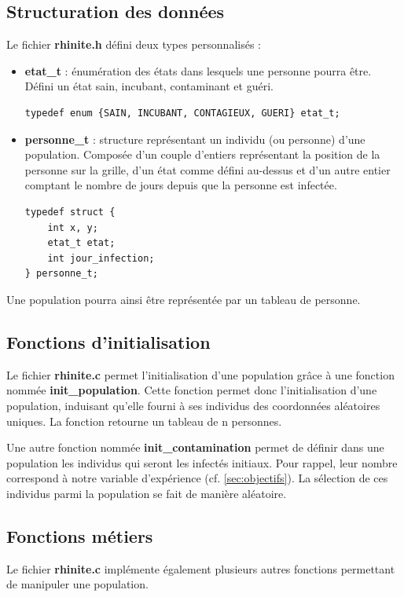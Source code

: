 \documentclass[12pt,french,titlepage]{article}
\begin{document}
\subsection{Structuration des données}
\label{sec:struct_donnees}
Le fichier \textbf{rhinite.h} défini deux types personnalisés :
\begin{itemize}
\item \textbf{etat\_t} : énumération des états dans lesquels une personne pourra être. Défini un état sain, incubant, contaminant et guéri.
\begin{lstlisting}
typedef enum {SAIN, INCUBANT, CONTAGIEUX, GUERI} etat_t;
\end{lstlisting}

\item \textbf{personne\_t} : structure représentant un individu (ou personne) d'une population. Composée d'un couple d'entiers représentant la position de la personne sur la grille, d'un état comme défini au-dessus et d'un autre entier comptant le nombre de jours depuis que la personne est infectée.
\begin{lstlisting}
typedef struct {
    int x, y;
    etat_t etat;
    int jour_infection;
} personne_t;
\end{lstlisting}
\end{itemize}

Une population pourra ainsi être représentée par un tableau de personne. 

\subsection{Fonctions d'initialisation}
Le fichier \textbf{rhinite.c} permet l'initialisation d'une population grâce à une fonction nommée \textbf{init\_population}. Cette fonction permet donc l'initialisation d'une population, induisant qu'elle fourni à ses individus des coordonnées aléatoires uniques. La fonction retourne un tableau de n personnes.

Une autre fonction nommée \textbf{init\_contamination} permet de définir dans une population les individus qui seront les infectés initiaux. Pour rappel, leur nombre correspond à notre variable d'expérience (cf. \ref{sec:objectifs}). La sélection de ces individus parmi la population se fait de manière aléatoire.   


\subsection{Fonctions métiers}
Le fichier \textbf{rhinite.c} implémente également plusieurs autres fonctions permettant de manipuler une population.
\end{document}

